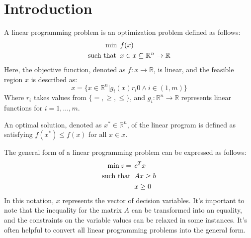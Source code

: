 \section{Introduction}

\begin{definition}
    A linear programming problem is an optimization problem defined as follows:
    \begin{align*}
        \min                      \:&\:f(x)           \\
        \textnormal{such that }     &\: x \in x \subseteq \mathbb{R}^n \rightarrow \mathbb{R} 
    \end{align*}
    Here, the objective function, denoted as $f:x \rightarrow \mathbb{R}$, is linear, and the feasible region $x$ is described as:
    \[x=\{x\in\mathbb{R}^n|g_i(x)r_i0\land i\in(1,m)\}\]
    Where $r_i$ takes values from $\{=,\geq,\leq\}$, and $g_i:\mathbb{R}^n\rightarrow\mathbb{R}$ represents linear functions for $i=1,\dots,m$.
\end{definition}
\begin{definition}
    An optimal solution, denoted as $x^{*} \in \mathbb{R}^n$, of the linear program is defined as satisfying $f(x^{*}) \leq f(x)$ for all $x\in x$.
\end{definition}
The general form of a linear programming problem can be expressed as follows:
\begin{align*}
    \min{z}=                  \:&\: c^Tx           \\
    \textnormal{such that }     &\: Ax \geq b       \\
                                &\: x \geq 0 
\end{align*}
In this notation, $x$ represents the vector of decision variables.
It's important to note that the inequality for the matrix $A$ can be transformed into an equality, and the constraints on the variable values can be relaxed in some instances.
It's often helpful to convert all linear programming problems into the general form.

